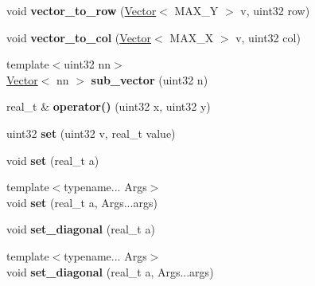 \begin{DoxyCompactItemize}
\item 
\hypertarget{classetk_1_1_matrix_a1052e5c4335472113701b175d46f4d05}{void {\bfseries vector\-\_\-to\-\_\-row} (\hyperlink{classetk_1_1_vector}{Vector}$<$ M\-A\-X\-\_\-\-Y $>$ v, uint32 row)}\label{classetk_1_1_matrix_a1052e5c4335472113701b175d46f4d05}

\item 
\hypertarget{classetk_1_1_matrix_a45aa5687564deab893935fc026033936}{void {\bfseries vector\-\_\-to\-\_\-col} (\hyperlink{classetk_1_1_vector}{Vector}$<$ M\-A\-X\-\_\-\-X $>$ v, uint32 col)}\label{classetk_1_1_matrix_a45aa5687564deab893935fc026033936}

\item 
\hypertarget{classetk_1_1_matrix_ac8948d5f832a65da448a9f966c205113}{{\footnotesize template$<$uint32 nn$>$ }\\\hyperlink{classetk_1_1_vector}{Vector}$<$ nn $>$ {\bfseries sub\-\_\-vector} (uint32 n)}\label{classetk_1_1_matrix_ac8948d5f832a65da448a9f966c205113}

\item 
\hypertarget{classetk_1_1_matrix_ab4596adc0f874c0d4951132723e88cc8}{real\-\_\-t \& {\bfseries operator()} (uint32 x, uint32 y)}\label{classetk_1_1_matrix_ab4596adc0f874c0d4951132723e88cc8}

\item 
\hypertarget{classetk_1_1_matrix_a2a942a4ab565d29c9e56ae407d08b049}{uint32 {\bfseries set} (uint32 v, real\-\_\-t value)}\label{classetk_1_1_matrix_a2a942a4ab565d29c9e56ae407d08b049}

\item 
\hypertarget{classetk_1_1_matrix_af453e0ee083a454d45328ad7ba043c14}{void {\bfseries set} (real\-\_\-t a)}\label{classetk_1_1_matrix_af453e0ee083a454d45328ad7ba043c14}

\item 
\hypertarget{classetk_1_1_matrix_aba593f176d4ea343bc86c0cf426076ef}{{\footnotesize template$<$typename... Args$>$ }\\void {\bfseries set} (real\-\_\-t a, Args...\-args)}\label{classetk_1_1_matrix_aba593f176d4ea343bc86c0cf426076ef}

\item 
\hypertarget{classetk_1_1_matrix_a7a4b391a7c10f2e8a5d03bf7c485cc5b}{void {\bfseries set\-\_\-diagonal} (real\-\_\-t a)}\label{classetk_1_1_matrix_a7a4b391a7c10f2e8a5d03bf7c485cc5b}

\item 
\hypertarget{classetk_1_1_matrix_ae6c66252bb3136fa1408d2aa4417932f}{{\footnotesize template$<$typename... Args$>$ }\\void {\bfseries set\-\_\-diagonal} (real\-\_\-t a, Args...\-args)}\label{classetk_1_1_matrix_ae6c66252bb3136fa1408d2aa4417932f}


\end{DoxyCompactItemize}
